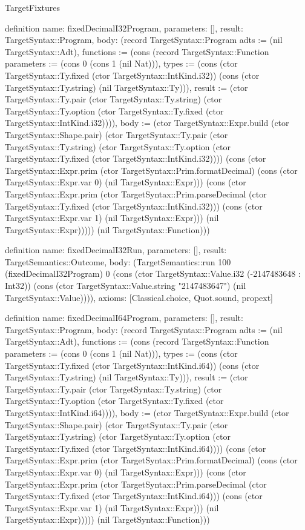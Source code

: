 \begin{lexlean}{TargetFixtures}
\begin{semanticmodule}
definition{
  name: fixedDecimalI32Program,
  parameters: [],
  result: TargetSyntax::Program,
  body: (record TargetSyntax::Program {adts := (nil TargetSyntax::Adt), functions := (cons (record TargetSyntax::Function {parameters := (cons 0 (cons 1 (nil Nat))), types := (cons (ctor TargetSyntax::Ty.fixed (ctor TargetSyntax::IntKind.i32)) (cons (ctor TargetSyntax::Ty.string) (nil TargetSyntax::Ty))), result := (ctor TargetSyntax::Ty.pair (ctor TargetSyntax::Ty.string) (ctor TargetSyntax::Ty.option (ctor TargetSyntax::Ty.fixed (ctor TargetSyntax::IntKind.i32)))), body := (ctor TargetSyntax::Expr.build (ctor TargetSyntax::Shape.pair) (ctor TargetSyntax::Ty.pair (ctor TargetSyntax::Ty.string) (ctor TargetSyntax::Ty.option (ctor TargetSyntax::Ty.fixed (ctor TargetSyntax::IntKind.i32)))) (cons (ctor TargetSyntax::Expr.prim (ctor TargetSyntax::Prim.formatDecimal) (cons (ctor TargetSyntax::Expr.var 0) (nil TargetSyntax::Expr))) (cons (ctor TargetSyntax::Expr.prim (ctor TargetSyntax::Prim.parseDecimal (ctor TargetSyntax::Ty.fixed (ctor TargetSyntax::IntKind.i32))) (cons (ctor TargetSyntax::Expr.var 1) (nil TargetSyntax::Expr))) (nil TargetSyntax::Expr))))}) (nil TargetSyntax::Function))})
}

definition{
  name: fixedDecimalI32Run,
  parameters: [],
  result: TargetSemantics::Outcome,
  body: (TargetSemantics::run 100 (fixedDecimalI32Program) 0 (cons (ctor TargetSyntax::Value.i32 (-2147483648 : Int32)) (cons (ctor TargetSyntax::Value.string "2147483647") (nil TargetSyntax::Value)))),
  axioms: [Classical.choice, Quot.sound, propext]
}

definition{
  name: fixedDecimalI64Program,
  parameters: [],
  result: TargetSyntax::Program,
  body: (record TargetSyntax::Program {adts := (nil TargetSyntax::Adt), functions := (cons (record TargetSyntax::Function {parameters := (cons 0 (cons 1 (nil Nat))), types := (cons (ctor TargetSyntax::Ty.fixed (ctor TargetSyntax::IntKind.i64)) (cons (ctor TargetSyntax::Ty.string) (nil TargetSyntax::Ty))), result := (ctor TargetSyntax::Ty.pair (ctor TargetSyntax::Ty.string) (ctor TargetSyntax::Ty.option (ctor TargetSyntax::Ty.fixed (ctor TargetSyntax::IntKind.i64)))), body := (ctor TargetSyntax::Expr.build (ctor TargetSyntax::Shape.pair) (ctor TargetSyntax::Ty.pair (ctor TargetSyntax::Ty.string) (ctor TargetSyntax::Ty.option (ctor TargetSyntax::Ty.fixed (ctor TargetSyntax::IntKind.i64)))) (cons (ctor TargetSyntax::Expr.prim (ctor TargetSyntax::Prim.formatDecimal) (cons (ctor TargetSyntax::Expr.var 0) (nil TargetSyntax::Expr))) (cons (ctor TargetSyntax::Expr.prim (ctor TargetSyntax::Prim.parseDecimal (ctor TargetSyntax::Ty.fixed (ctor TargetSyntax::IntKind.i64))) (cons (ctor TargetSyntax::Expr.var 1) (nil TargetSyntax::Expr))) (nil TargetSyntax::Expr))))}) (nil TargetSyntax::Function))})
}


\end{semanticmodule}
\end{lexlean}
